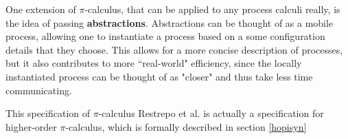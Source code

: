 One extension of $\pi$-calculus, that can be applied to any process calculi really, is the idea of passing \textbf{abstractions}. Abstractions can be thought of as a mobile process, allowing one to instantiate a process based on a some configuration details that they choose. This allows for a more concise description of processes, but it also contributes to more ``real-world" efficiency, since the locally instantiated process can be thought of as "closer" and thus take less time communicating.

This specification of $\pi$-calculus Restrepo et al. \cite{main} is actually a specification for higher-order $\pi$-calculus, which is formally described in section \ref{hopisyn}

